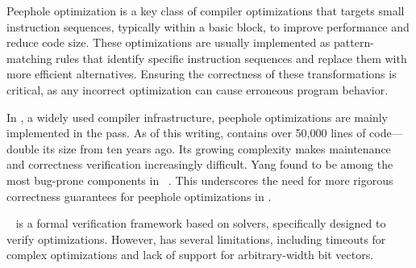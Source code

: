 Peephole optimization is a key class of compiler optimizations that
targets small instruction sequences, typically within a basic block,
to improve performance and reduce code size. These optimizations are
usually implemented as pattern-matching rules that identify specific
instruction sequences and replace them with more efficient alternatives.
Ensuring the correctness of these transformations is critical, as any
incorrect optimization can cause erroneous program behavior.

In \llvm, a widely used compiler infrastructure, peephole optimizations
are mainly implemented in the \instcombine pass. As of this writing,
\instcombine contains over 50{,}000 lines of code—double its size from
ten years ago. Its growing complexity makes maintenance and correctness
verification increasingly difficult.
Yang \etal found \instcombine to be among the most bug-prone components
in \llvm~\cite{yang2011finding}.
This underscores the need for more rigorous correctness guarantees
for peephole optimizations in \llvm.

\alive~\cite{lopes2021alive2} is a formal verification framework based on \smt solvers,
specifically designed to verify \llvm optimizations. However, \alive
has several limitations, including timeouts for complex optimizations
and lack of support for arbitrary-width bit vectors.

